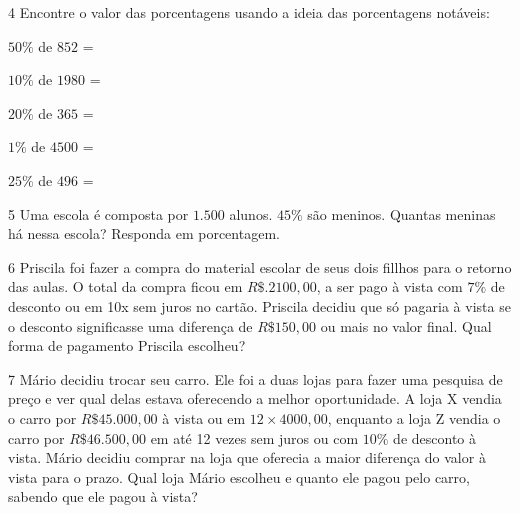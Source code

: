 \num{4} Encontre o valor das porcentagens usando a ideia das porcentagens
notáveis:

\begin{multicols}{2}
\begin{escolha}[itemsep=0pt]
  \item $50\%$ de $852$ =  \\
  \item $10\%$ de $1980$ =  \\
  \item $20\%$ de $365$ =  \\
  \item $1\%$ de $4500$ =  \\
  \item $25\%$ de $496$ =  
\end{escolha}
\end{multicols}

\num{5} Uma escola é composta por $1.500$ alunos. $45\%$ são meninos. Quantas
meninas há nessa escola? Responda em porcentagem.


\num{6} Priscila foi fazer a compra do material escolar de seus dois fillhos
para o retorno das aulas. O total da compra ficou em $R\$.2100,00$, a ser
pago à vista com $7\%$ de desconto ou em 10x sem juros no cartão. Priscila
decidiu que só pagaria à vista se o desconto significasse uma diferença
de $R\$150,00$ ou mais no valor final. Qual forma de pagamento Priscila
escolheu?



\num{7} Mário decidiu trocar seu carro. Ele foi a duas lojas para fazer uma
pesquisa de preço e ver qual delas estava oferecendo a melhor
oportunidade. A loja X vendia o carro por $R\$45.000,00$ à vista ou em
$12 \times 4000,00$, enquanto a loja Z vendia o carro por $R\$46.500,00$
em até 12 vezes sem juros ou com $10\%$ de desconto à vista. Mário decidiu
comprar na loja que oferecia a maior diferença do valor à vista para o
prazo. Qual loja Mário escolheu e quanto ele pagou pelo carro, sabendo
que ele pagou à vista?

